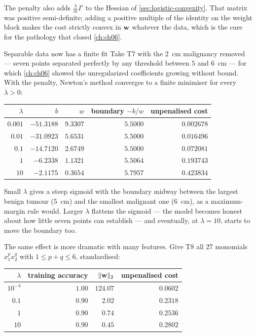 The penalty also adds $\frac{\lambda}{m}I'$ to the Hessian of
\cref{sec:logistic-convexity}. That matrix was positive semi-definite; adding a
positive multiple of the identity on the weight block makes the cost strictly
convex in $\mathbf{w}$ whatever the data, which is the cure for the pathology that
closed \cref{ch:ch06}.

\begin{workedexample}{Separable data now has a finite fit}
Take T7 with the $2$~cm malignancy removed --- seven points separated perfectly
by any threshold between $5$ and $6$~cm --- for which \cref{ch:ch06} showed the unregularized coefficients
growing without bound. With the penalty, Newton's method converges to a finite
minimiser for every $\lambda > 0$:

\begin{center}
\small
\renewcommand{\arraystretch}{1.15}
\begin{tabular}{@{}rrrrr@{}}
\toprule
$\lambda$ & $b$ & $w$ & boundary $-b/w$ & unpenalised cost\\
\midrule
$0.001$ & $-51.3188$ & $9.3307$ & $5.5000$ & $0.002678$\\
$0.01$  & $-31.0923$ & $5.6531$ & $5.5000$ & $0.016496$\\
$0.1$   & $-14.7120$ & $2.6749$ & $5.5000$ & $0.072081$\\
$1$     & $-6.2338$  & $1.1321$ & $5.5064$ & $0.193743$\\
$10$    & $-2.1175$  & $0.3654$ & $5.7957$ & $0.423834$\\
\bottomrule
\end{tabular}
\end{center}

Small $\lambda$ gives a steep sigmoid with the boundary midway between the
largest benign tumour ($5$~cm) and the smallest malignant one ($6$~cm), as a
maximum-margin rule would. Larger $\lambda$ flattens the sigmoid --- the model
becomes honest about how little seven points can establish --- and eventually,
at $\lambda = 10$, starts to move the boundary too.
\end{workedexample}

The same effect is more dramatic with many features. Give T8 all $27$ monomials
$x_1^px_2^q$ with $1 \le p+q \le 6$, standardised:

\begin{center}
\small
\renewcommand{\arraystretch}{1.15}
\begin{tabular}{@{}rrrr@{}}
\toprule
$\lambda$ & training accuracy & $\|\mathbf{w}\|_2$ & unpenalised cost\\
\midrule
$10^{-4}$ & $1.00$ & $124.07$ & $0.0602$\\
$0.1$     & $0.90$ & $2.02$   & $0.2318$\\
$1$       & $0.90$ & $0.74$   & $0.2536$\\
$10$      & $0.90$ & $0.45$   & $0.2802$\\
\bottomrule
\end{tabular}
\end{center}

